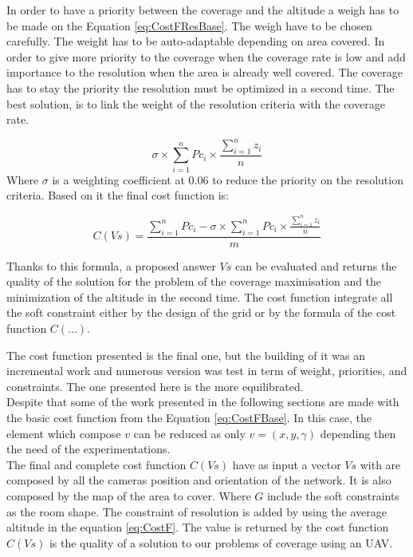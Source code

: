 In order to have a priority  between the coverage and the altitude a weigh has to be made on the Equation \ref{eq:CostFResBase}. The weigh have to be chosen carefully.
The weight has to be auto-adaptable depending on area covered. In order to give more priority to the coverage when the coverage rate is low and add importance to the resolution when the area is already well covered. The coverage has to stay the priority the resolution must be optimized in a second time.
The best solution, is to link the weight of the resolution criteria with the coverage rate.

\begin{equation}\label{eq:CostFResPondere}
  \sigma \times \sum_{i=1}^n {Pc_i} \times \frac{\sum_{i=1}^n z_i}{n}     
\end{equation}
Where $\sigma$ is a weighting coefficient at 0.06 to reduce the priority on the resolution criteria. 
Based on it the final cost function is: 

\begin{equation}\label{eq:CostF}
C(Vs) =  \frac{\sum_{i=1}^n{Pc_i}  - \sigma  \times \sum_{i=1}^n {Pc_i} \times \frac{\sum_{i=1}^n z_i}{n}  }{m}   
\end{equation}

Thanks to this formula, a proposed answer $Vs$ can be evaluated and returns the quality of the solution for the problem of the coverage maximisation and the minimization of the altitude in the second time. The cost function integrate all the soft constraint either by the design of the grid or by the formula of the cost function $C(...)$.

The cost function presented is the final one, but the building of it was an incremental work and numerous version was test in term of weight, priorities, and constraints. The one presented here is the more equilibrated.\\ 
Despite that some of the work  presented in the following sections are made with the basic cost function from the Equation \ref{eq:CostFBase}. In this case, the element which compose $v$ can be reduced as only $v=(x,y,\gamma)$ depending then the need of the experimentations.\\

The final and complete cost function $C(Vs)$ have as input a vector $Vs$ with are composed by all the cameras position and orientation of the network. It is also composed by the map of the area to cover. Where $G$ include the soft constraints as the room shape. The constraint of resolution is added by using the average altitude in the equation \ref{eq:CostF}.
The value is returned by the cost function $C(Vs)$ is the quality of a solution to our problems of coverage using an UAV.






